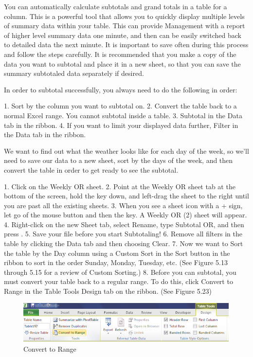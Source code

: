 You can automatically calculate subtotals and grand totals in a table for a column. This is a powerful
tool that allows you to quickly display multiple levels of summary data within your table. This can
provide Management with a report of higher level summary data one minute, and then can be easily
switched back to detailed data the next minute. It is important to save often during this process and
follow the steps carefully. It is recommended that you make a copy of the data you want to subtotal
and place it in a new sheet, so that you can save the summary subtotaled data separately if desired.

In order to subtotal successfully, you always need to do the following in order:

1.   Sort by the column you want to subtotal on.
2.   Convert the table back to a normal Excel range. You cannot subtotal inside a table.
3.   Subtotal in the Data tab in the ribbon.
4.   If you want to limit your displayed data further, Filter in the Data tab in the ribbon.

We want to find out what the weather looks like for each day of the week, so we’ll need to save our
data to a new sheet, sort by the days of the week, and then convert the table in order to get ready to
see the subtotal.

1. Click on the Weekly OR sheet.
2. Point at the Weekly OR sheet tab at the bottom of the screen, hold the  key down, and
left-drag the sheet to the right until you are past all the existing sheets.
3. When you see a sheet icon with a + sign, let go of the mouse button and then the  key. A
Weekly OR (2) sheet will appear.
4. Right-click on the new Sheet tab, select Rename, type Subtotal OR, and then press .
5. Save your file before you start Subtotaling!
6. Remove all filters in the table by clicking the Data tab and then choosing Clear.
7. Now we want to Sort the table by the Day column using a Custom Sort in the Sort button in the
ribbon to sort in the order Sunday, Monday, Tuesday, etc. (See Figure 5.13 through 5.15 for a
review of Custom Sorting.)
8. Before you can subtotal, you must convert your table back to a regular range. To do this, click
Convert to Range in the Table Tools Design tab on the ribbon. (See Figure 5.23)


\begin{figure}[H]
	\centering
	\includegraphics[width=\maxwidth{.95\linewidth}]{gfx/ch05_fig23}
	\caption{Convert to Range}
	\label{05:fig23}
\end{figure}





